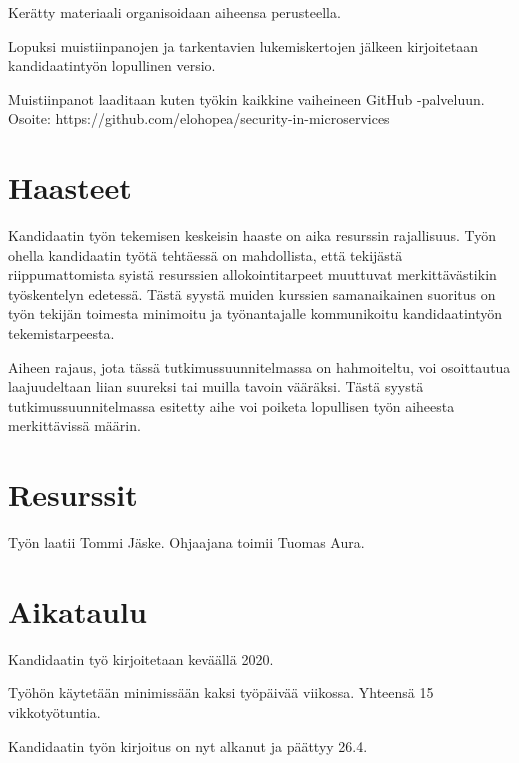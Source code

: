 \documentclass[12pt,a4paper,finnish,oneside]{article}
\begin{document}
Kerätty materiaali organisoidaan aiheensa perusteella.

Lopuksi muistiinpanojen ja tarkentavien lukemiskertojen jälkeen kirjoitetaan kandidaatintyön lopullinen versio.

Muistiinpanot laaditaan kuten työkin kaikkine vaiheineen GitHub -palveluun. 
Osoite: https://github.com/elohopea/security-in-microservices

\section{Haasteet}

Kandidaatin työn tekemisen keskeisin haaste on aika resurssin rajallisuus. 
Työn ohella kandidaatin työtä tehtäessä on mahdollista, että tekijästä riippumattomista 
syistä resurssien allokointitarpeet muuttuvat merkittävästikin työskentelyn edetessä. 
Tästä syystä muiden kurssien samanaikainen suoritus on työn tekijän toimesta minimoitu ja 
työnantajalle kommunikoitu kandidaatintyön tekemistarpeesta.

Aiheen rajaus, jota tässä tutkimussuunnitelmassa on hahmoiteltu, voi osoittautua laajuudeltaan 
liian suureksi tai muilla tavoin vääräksi. Tästä syystä tutkimussuunnitelmassa esitetty aihe voi poiketa lopullisen työn aiheesta merkittävissä määrin.

\section{Resurssit}

Työn laatii Tommi Jäske. 
Ohjaajana toimii Tuomas Aura.

\section{Aikataulu}

Kandidaatin työ kirjoitetaan keväällä 2020.

Työhön käytetään minimissään kaksi työpäivää viikossa. Yhteensä 15 vikkotyötuntia.

Kandidaatin työn kirjoitus on nyt alkanut ja päättyy 26.4.
\end{document}
